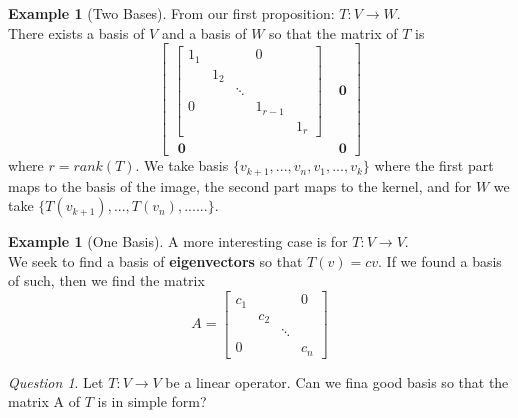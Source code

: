 \documentclass[12pt]{article}
\theoremstyle{definition}
\newtheorem{eg}[thm]{Example}
\theoremstyle{remark}
\newtheorem*{qst}{Question}
\numberwithin{equation}{section}
\newcommand\B[1]{\textbf{ #1}}
\begin{document}
\vspace{15pt}

\begin{eg}[Two Bases]
        From our first proposition: $T:V\rightarrow W$. \\
        There exists a basis of $V$ and a basis of $W$ so that the matrix of $T$ is \begin{equation}
                \begin{bmatrix} \begin{bmatrix} 1_1 & & & 0 & \\ & 1_2 & & & \\ & & \ddots & & \\ 0 & & & 1_{r-1} & \\ & & & & 1_r  \end{bmatrix} & \B{0} \\ \B{0} & \B{0} \end{bmatrix}
        \end{equation}
        where $r = rank(T)$. We take basis $\{v_{k+1},...,v_{n},v_1,...,v_k\}$ where the first part maps to the basis of the image, the second part maps to the kernel, and for $W$ we take $\{T(v_{k+1}),...,T(v_{n}),......\}$.
\end{eg}

\vspace{15pt}

\begin{eg}[One Basis]
        A more interesting case is for $T: V\rightarrow V$. \\
        We seek to find a basis of \B{eigenvectors} so that $T(v) = cv$. If we found a basis of such, then we find the matrix \begin{equation}
                A = \begin{bmatrix} c_1 & & & 0 \\ & c_2 & & \\ & & \ddots & \\ 0 & & & c_n \end{bmatrix}
        \end{equation}
\end{eg}

\vspace{15pt}

\begin{qst}
        Let $T:V\rightarrow V$ be a linear operator. Can we fina good basis so that the matrix A of $T$ is in simple form?
\end{qst}

\vspace{15pt}
\end{document}
